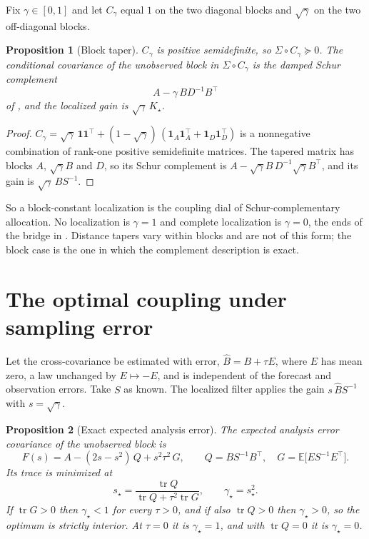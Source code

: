 \documentclass[11pt]{article}
\newtheorem{proposition}{Proposition}
\theoremstyle{remark}
\newcommand{\E}{\mathbb{E}}
\newcommand{\ones}{\mathbf{1}}
\DeclareMathOperator{\tr}{tr}
\begin{document}
Fix $\gamma\in[0,1]$ and let $C_\gamma$ equal $1$ on the two diagonal blocks
and $\sqrt\gamma$ on the two off-diagonal blocks.

\begin{proposition}[Block taper]
\label{prop:taper}
$C_\gamma$ is positive semidefinite, so $\Sigma\circ C_\gamma\succeq0$. The
conditional covariance of the unobserved block in $\Sigma\circ C_\gamma$ is
the damped Schur complement
\begin{equation}
  A-\gamma\,BD^{-1}B^\top
  \label{eq:damped}
\end{equation}
of \cite{cotton2024schur}, and the localized gain is $\sqrt\gamma\,K_\star$.
\end{proposition}

\begin{proof}
$C_\gamma=\sqrt\gamma\,\ones\ones^\top+(1-\sqrt\gamma)\,
(\ones_A\ones_A^\top+\ones_D\ones_D^\top)$ is a nonnegative combination of
rank-one positive semidefinite matrices. The tapered matrix has blocks $A$,
$\sqrt\gamma B$ and $D$, so its Schur complement is
$A-\sqrt\gamma B\,D^{-1}\sqrt\gamma B^\top$, and its gain is
$\sqrt\gamma\,BS^{-1}$.
\end{proof}

So a block-constant localization is the coupling dial of Schur-complementary
allocation. No localization is $\gamma=1$ and complete localization is
$\gamma=0$, the ends of the bridge in \cite{cotton2024schur,cotton2026bridge}.
Distance tapers vary within blocks and are not of this form; the block case
is the one in which the complement description is exact.

\section{The optimal coupling under sampling error}

Let the cross-covariance be estimated with error, $\widehat B=B+\tau E$,
where $E$ has mean zero, a law unchanged by $E\mapsto-E$, and is
independent of the forecast and observation errors. Take $S$ as known. The
localized filter applies the gain $s\,\widehat BS^{-1}$ with $s=\sqrt\gamma$.

\begin{proposition}[Exact expected analysis error]
\label{prop:optimal}
The expected analysis error covariance of the unobserved block is
\begin{equation}
  F(s)=A-(2s-s^2)\,Q+s^2\tau^2\,G,
  \qquad Q=BS^{-1}B^\top,\quad G=\E\big[ES^{-1}E^\top\big].
  \label{eq:F}
\end{equation}
Its trace is minimized at
\begin{equation}
  s_\star=\frac{\tr Q}{\tr Q+\tau^2\tr G},
  \qquad
  \gamma_\star=s_\star^2 .
  \label{eq:sstar}
\end{equation}
If $\tr G>0$ then $\gamma_\star<1$ for every $\tau>0$, and if also
$\tr Q>0$ then $\gamma_\star>0$, so the optimum is strictly interior. At
$\tau=0$ it is $\gamma_\star=1$, and with $\tr Q=0$ it is $\gamma_\star=0$.
\end{proposition}
\end{document}
